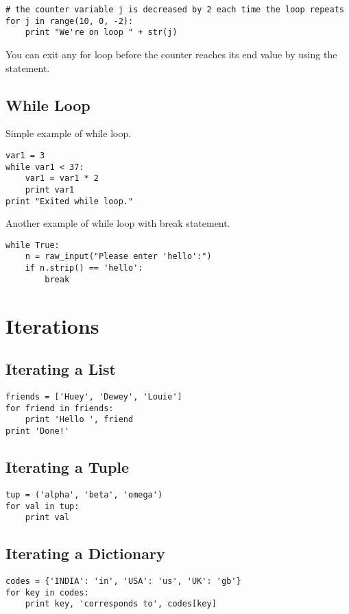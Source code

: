\documentclass[a4paper,9pt]{extarticle}
\begin{document}
\begin{multicols*}{2}
\begin{lstlisting}
# the counter variable j is decreased by 2 each time the loop repeats
for j in range(10, 0, -2):
    print "We're on loop " + str(j)
\end{lstlisting}

You can exit any for loop before the counter reaches its end value by using the  statement.

\subsection{While Loop}
Simple example of while loop.
\begin{lstlisting}
var1 = 3
while var1 < 37:
    var1 = var1 * 2
    print var1
print "Exited while loop."
\end{lstlisting}
\vspace{5 mm}
Another example of while loop with break statement.
\begin{lstlisting}
while True:
    n = raw_input("Please enter 'hello':")
    if n.strip() == 'hello':
        break
\end{lstlisting}

\section{Iterations}

\subsection{Iterating a List}
\begin{lstlisting}
friends = ['Huey', 'Dewey', 'Louie']
for friend in friends:
    print 'Hello ', friend
print 'Done!'
\end{lstlisting}

\subsection{Iterating a Tuple}
\begin{lstlisting}
tup = ('alpha', 'beta', 'omega')
for val in tup:
    print val
\end{lstlisting}

\subsection{Iterating a Dictionary}
\begin{lstlisting}
codes = {'INDIA': 'in', 'USA': 'us', 'UK': 'gb'}
for key in codes:
    print key, 'corresponds to', codes[key]


\end{lstlisting}
\end{multicols*}
\end{document}
